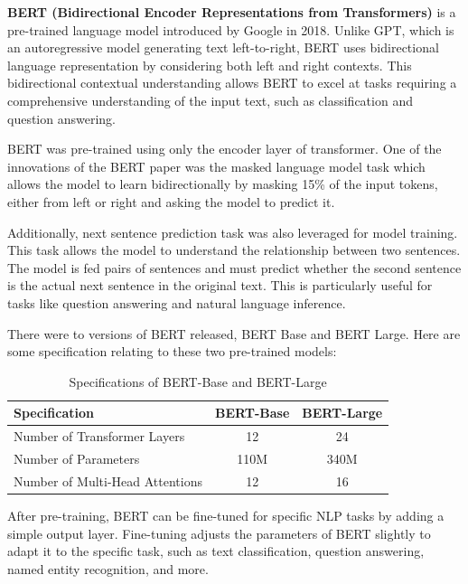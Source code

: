\documentclass[11pt,twoside]{article}
\begin{document}
\textbf{BERT (Bidirectional Encoder Representations from Transformers)} is a pre-trained language model introduced by Google in 2018. Unlike GPT, which is an autoregressive model generating text left-to-right, BERT uses bidirectional language representation by considering both left and right contexts. This bidirectional contextual understanding allows BERT to excel at tasks requiring a comprehensive understanding of the input text, such as classification and question answering.

BERT was pre-trained using only the encoder layer of transformer. One of the innovations of the BERT paper was the masked language model task which allows the model to learn bidirectionally by masking 15\% of the input tokens, either from left or right and asking the model to predict it.

Additionally, next sentence prediction task was also leveraged for model training. This task allows the model to understand the relationship between two sentences. The model is fed pairs of sentences and must predict whether the second sentence is the actual next sentence in the original text. This is particularly useful for tasks like question answering and natural language inference.


There were to versions of BERT released, BERT Base and BERT Large. Here are some specification relating to these two pre-trained models: \\

\begin{table}[H]
\centering
\renewcommand{\arraystretch}{1.5}
\setlength{\tabcolsep}{10pt}
\begin{tabular}{@{}lcc@{}}
\toprule
\textbf{Specification}           & \textbf{BERT-Base} & \textbf{BERT-Large} \\ \midrule
Number of Transformer Layers     & 12                 & 24                  \\
Number of Parameters             & 110M               & 340M                \\
Number of Multi-Head Attentions  & 12                 & 16                  \\ \bottomrule
\end{tabular}
\caption{Specifications of BERT-Base and BERT-Large}
\label{tab:bert_specs}
\end{table}


After pre-training, BERT can be fine-tuned for specific NLP tasks by adding a simple output layer. Fine-tuning adjusts the parameters of BERT slightly to adapt it to the specific task, such as text classification, question answering, named entity recognition, and more.
\end{document}
